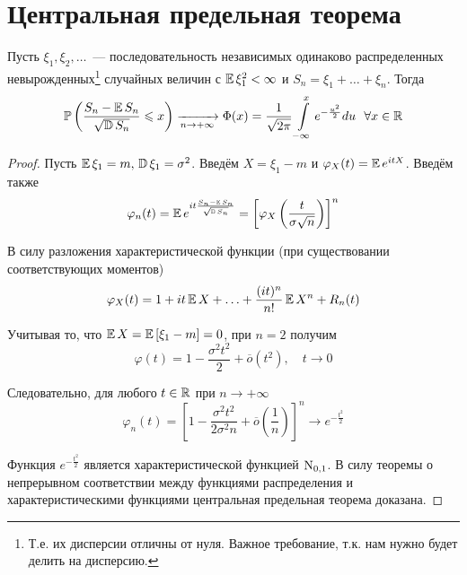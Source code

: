 \section{Центральная предельная теорема}
\begin{namedthm}
    Пусть $\xi_{1}, \xi_{2}, \ldots$~--- последовательность независимых одинаково распределенных невырожденных\footnote{Т.е. их дисперсии отличны от нуля. Важное требование, т.к. нам нужно будет делить на дисперсию.} случайных величин с $\operatorname{\mathbb{E}} \xi_{1}^{2}<\infty$ и $S_{n}=\xi_{1}+\ldots+\xi_{n}$. 
    Тогда
    \begin{equation*}
        \operatorname{\mathbb{P}}\left(\frac{S_{n}-\operatorname{\mathbb{E}} S_{n}}{\sqrt{\operatorname{\mathbb{D}} S_{n}}} \leqslant x\right)
        \xrightarrow[n \to +\infty]{}
        \Phi(x) = \frac{1}{\sqrt{2 \pi}} \int\limits_{-\infty}^{x} e^{-\frac{u^{2}}{2}} du~~ \forall x \in \mathbb{R}
    \end{equation*}
\end{namedthm}
\begin{proof}
Пусть $\operatorname{\mathbb{E}} \xi_{1}=m,\, \operatorname{\mathbb{D}} \xi_{1}=\sigma^{2}$. 
Введём $X = \xi_1 - m$ и $\varphi_X(t)=\operatorname{\mathbb{E}} e^{i tX}$. 
Введём также
\begin{equation*}
    \varphi_{n}(t)=\operatorname{\mathbb{E}} e^{i t \frac{S_{n}-\operatorname{\mathbb{E}} S_{n}}{\sqrt{\operatorname{\mathbb{D}} S_{n}}}} = 
    \left[\varphi_X\left(\frac{t}{\sigma \sqrt{n}}\right)\right]^{n}
\end{equation*}

В силу разложения характеристической функции (при существовании соответствующих моментов)
\begin{equation*}
    \varphi_{X}(t)=1+i t \operatorname{\mathbb{E}} X+\ldots+\frac{(i t)^{n}}{n !} \operatorname{\mathbb{E}} X^{n}+R_{n}(t)
\end{equation*}

Учитывая то, что $\operatorname{\mathbb{E}} X = \operatorname{\mathbb{E}} \left[ \xi_1 - m\right] = 0$, при $n=2$ получим 
\begin{equation*}
    \varphi(t)=1-\frac{\sigma^{2} t^{2}}{2}+\overline{o}\left(t^{2}\right), \quad t \to 0
\end{equation*}

Следовательно, для любого $t \in \mathbb{R}$ при $n \to +\infty$
\begin{equation*}
    \varphi_{n}(t)=\left[1-\frac{\sigma^{2} t^{2}}{2 \sigma^{2} n}+\overline{o}\left(\frac{1}{n}\right)\right]^n \to e^{-\frac{t^{2}}{2}}
\end{equation*}

Функция $e^{-\frac{t^{2}}{2}}$ является характеристической функцией $\operatorname{\mathrm{N}}_{0,1}$. 
В силу теоремы о непрерывном соответствии между функциями распределения и характеристическими функциями центральная предельная теорема доказана.
\end{proof}
